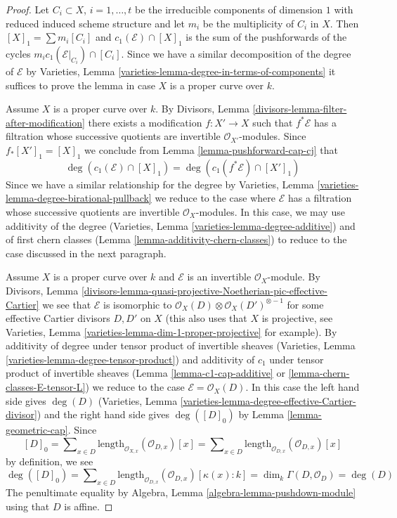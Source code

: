 \begin{proof}
Let $C_i \subset X$, $i = 1, \ldots, t$ be the irreducible components
of dimension $1$ with reduced induced scheme structure and let $m_i$ be the
multiplicity of $C_i$ in $X$. Then $[X]_1 = \sum m_i[C_i]$ and
$c_1(\mathcal{E}) \cap [X]_1$ is the sum of the pushforwards of the cycles
$m_i c_1(\mathcal{E}|_{C_i}) \cap [C_i]$. Since we have a similar decomposition
of the degree of $\mathcal{E}$ by
Varieties, Lemma \ref{varieties-lemma-degree-in-terms-of-components}
it suffices to prove the lemma in case $X$ is a proper curve over $k$.

\medskip\noindent
Assume $X$ is a proper curve over $k$.
By Divisors, Lemma \ref{divisors-lemma-filter-after-modification}
there exists a modification $f : X' \to X$ such that $f^*\mathcal{E}$
has a filtration whose successive quotients are invertible
$\mathcal{O}_{X'}$-modules. Since $f_*[X']_1 = [X]_1$ we conclude
from Lemma \ref{lemma-pushforward-cap-cj} that
$$
\deg(c_1(\mathcal{E}) \cap [X]_1) = \deg(c_1(f^*\mathcal{E}) \cap [X']_1)
$$
Since we have a similar relationship for the degree by
Varieties, Lemma \ref{varieties-lemma-degree-birational-pullback}
we reduce to the case where $\mathcal{E}$ has a filtration whose
successive quotients are invertible $\mathcal{O}_X$-modules.
In this case, we may use additivity of the degree
(Varieties, Lemma \ref{varieties-lemma-degree-additive})
and of first chern classes (Lemma \ref{lemma-additivity-chern-classes})
to reduce to the case discussed in the next paragraph.

\medskip\noindent
Assume $X$ is a proper curve over $k$ and $\mathcal{E}$ is an
invertible $\mathcal{O}_X$-module. By
Divisors, Lemma
\ref{divisors-lemma-quasi-projective-Noetherian-pic-effective-Cartier}
we see that $\mathcal{E}$ is isomorphic to
$\mathcal{O}_X(D) \otimes \mathcal{O}_X(D')^{\otimes -1}$
for some effective Cartier divisors $D, D'$ on $X$ (this also uses
that $X$ is projective, see
Varieties, Lemma \ref{varieties-lemma-dim-1-proper-projective} for example).
By additivity of degree under tensor product of invertible sheaves
(Varieties, Lemma \ref{varieties-lemma-degree-tensor-product})
and additivity of $c_1$ under tensor product of invertible sheaves
(Lemma \ref{lemma-c1-cap-additive} or \ref{lemma-chern-classes-E-tensor-L})
we reduce to the case $\mathcal{E} = \mathcal{O}_X(D)$.
In this case the left hand side gives $\deg(D)$
(Varieties, Lemma \ref{varieties-lemma-degree-effective-Cartier-divisor})
and the right hand side gives $\deg([D]_0)$ by
Lemma \ref{lemma-geometric-cap}.
Since
$$
[D]_0 = \sum\nolimits_{x \in D}
\text{length}_{\mathcal{O}_{X, x}}(\mathcal{O}_{D, x}) [x] =
\sum\nolimits_{x \in D}
\text{length}_{\mathcal{O}_{D, x}}(\mathcal{O}_{D, x}) [x]
$$
by definition, we see
$$
\deg([D]_0) = \sum\nolimits_{x \in D}
\text{length}_{\mathcal{O}_{D, x}}(\mathcal{O}_{D, x}) [\kappa(x) : k] =
\dim_k \Gamma(D, \mathcal{O}_D) = \deg(D)
$$
The penultimate equality by
Algebra, Lemma \ref{algebra-lemma-pushdown-module}
using that $D$ is affine.
\end{proof}



